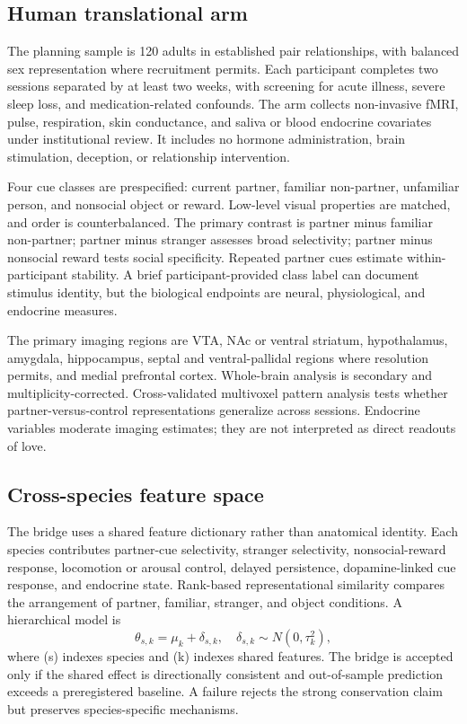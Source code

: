 \documentclass[conference]{IEEEtran}
\begin{document}
\subsection{Human translational arm}
The planning sample is 120 adults in established pair relationships, with balanced sex representation where recruitment permits. Each participant completes two sessions separated by at least two weeks, with screening for acute illness, severe sleep loss, and medication-related confounds. The arm collects non-invasive fMRI, pulse, respiration, skin conductance, and saliva or blood endocrine covariates under institutional review. It includes no hormone administration, brain stimulation, deception, or relationship intervention.

Four cue classes are prespecified: current partner, familiar non-partner, unfamiliar person, and nonsocial object or reward. Low-level visual properties are matched, and order is counterbalanced. The primary contrast is partner minus familiar non-partner; partner minus stranger assesses broad selectivity; partner minus nonsocial reward tests social specificity. Repeated partner cues estimate within-participant stability. A brief participant-provided class label can document stimulus identity, but the biological endpoints are neural, physiological, and endocrine measures.

The primary imaging regions are VTA, NAc or ventral striatum, hypothalamus, amygdala, hippocampus, septal and ventral-pallidal regions where resolution permits, and medial prefrontal cortex. Whole-brain analysis is secondary and multiplicity-corrected. Cross-validated multivoxel pattern analysis tests whether partner-versus-control representations generalize across sessions. Endocrine variables moderate imaging estimates; they are not interpreted as direct readouts of love.

\subsection{Cross-species feature space}
The bridge uses a shared feature dictionary rather than anatomical identity. Each species contributes partner-cue selectivity, stranger selectivity, nonsocial-reward response, locomotion or arousal control, delayed persistence, dopamine-linked cue response, and endocrine state. Rank-based representational similarity compares the arrangement of partner, familiar, stranger, and object conditions. A hierarchical model is
\begin{equation}
\theta_{s,k}=\mu_k+\delta_{s,k},\quad \delta_{s,k}\sim N(0,\tau_k^2),
\end{equation}
where (s) indexes species and (k) indexes shared features. The bridge is accepted only if the shared effect is directionally consistent and out-of-sample prediction exceeds a preregistered baseline. A failure rejects the strong conservation claim but preserves species-specific mechanisms.
\end{document}
